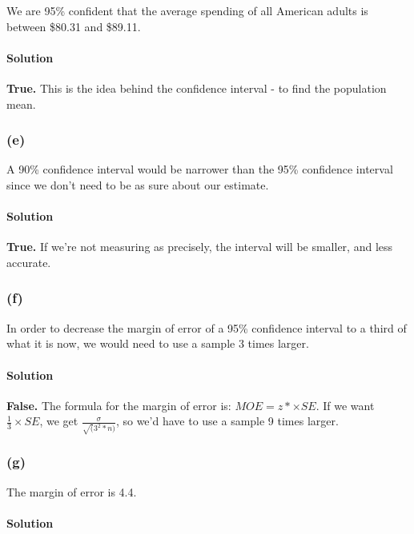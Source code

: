 \documentclass[]{article}
\let\oldparagraph\paragraph
\renewcommand{\paragraph}[1]{\oldparagraph{#1}\mbox{}}
\begin{document}
We are 95\% confident that the average spending of all American adults
is between \$80.31 and \$89.11.

\paragraph{Solution}\label{solution-8}

\textbf{True.} This is the idea behind the confidence interval - to find
the population mean.

\subsubsection{(e)}\label{e-1}

A 90\% confidence interval would be narrower than the 95\% confidence
interval since we don't need to be as sure about our estimate.

\paragraph{Solution}\label{solution-9}

\textbf{True.} If we're not measuring as precisely, the interval will be
smaller, and less accurate.

\subsubsection{(f)}\label{f}

In order to decrease the margin of error of a 95\% confidence interval
to a third of what it is now, we would need to use a sample 3 times
larger.

\paragraph{Solution}\label{solution-10}

\textbf{False.} The formula for the margin of error is:
\(MOE = z* \times SE\). If we want \(\frac{1}{3}\times SE\), we get
\(\frac{\sigma}{\sqrt(3^2 * n)}\), so we'd have to use a sample 9 times
larger.

\subsubsection{(g)}\label{g}

The margin of error is 4.4.

\paragraph{Solution}\label{solution-11}
\end{document}
